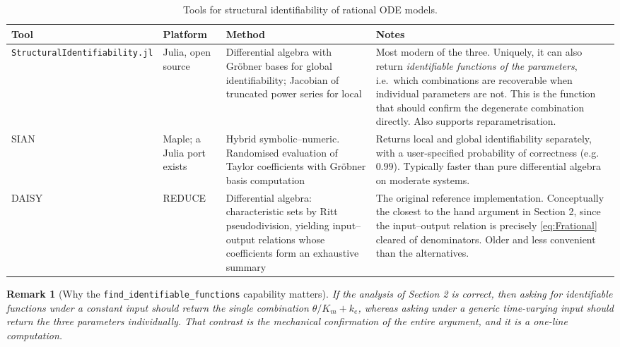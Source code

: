 \documentclass[11pt,a4paper]{article}
\newtheorem{remark}{Remark}
\begin{document}
\begin{adjustwidth}{-1.0cm}{-1.0cm}
\begin{table}[htbp]
\centering
\footnotesize
\caption{Tools for structural identifiability of rational ODE models.}
\label{tab:tools}
\begin{tabular}{@{}p{} p{} p{} p{}@{}}
\toprule
\textbf{Tool} & \textbf{Platform} & \textbf{Method} & \textbf{Notes} \\
\midrule
\texttt{Structural\-Identifiability.jl}
& Julia, open source
& Differential algebra with Gr\"obner bases for global identifiability; Jacobian of
truncated power series for local
& Most modern of the three. Uniquely, it can also return \emph{identifiable functions of
the parameters}, i.e.\ which combinations are recoverable when individual parameters are
not. This is the function that should confirm the degenerate combination directly. Also
supports reparametrisation. \\
\addlinespace
\textsc{SIAN}
& Maple; a Julia port exists
& Hybrid symbolic--numeric. Randomised evaluation of Taylor coefficients with Gr\"obner
basis computation
& Returns local and global identifiability separately, with a user-specified probability of
correctness (e.g.\ $0.99$). Typically faster than pure differential algebra on
moderate systems. \\
\addlinespace
\textsc{DAISY}
& REDUCE
& Differential algebra: characteristic sets by Ritt pseudodivision, yielding
input--output relations whose coefficients form an exhaustive summary
& The original reference implementation. Conceptually the closest to the hand argument in
Section 2, since the input--output relation is precisely \eqref{eq:Frational} cleared of
denominators. Older and less convenient than the alternatives. \\
\bottomrule
\end{tabular}
\end{table}
\end{adjustwidth}

\begin{remark}[Why the \texttt{find\_identifiable\_functions} capability matters]
If the analysis of Section 2 is correct, then asking for identifiable functions under a
constant input should return the single combination $\theta/K_m + k_e$, whereas asking under
a generic time-varying input should return the three parameters individually. That contrast
is the mechanical confirmation of the entire argument, and it is a one-line computation.
\end{remark}
\end{document}
